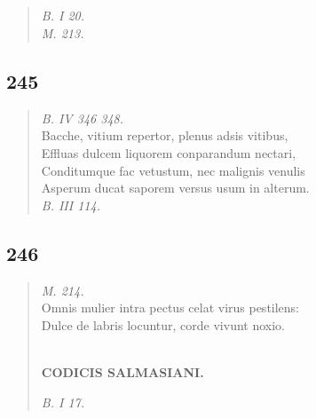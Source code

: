\documentclass[11pt, a4paper]{report}
\begin{document}
            \subsection*{}
      \begin{verse}
      \end{verse}
  
            \subsection*{}
      \begin{verse}
      \textit{B. I 20.} \\ \textit{M. 213.} \\ 
      \end{verse}
  
            \subsection*{245}
      \begin{verse}
      \textit{B. IV 346 348.} \\ Bacche, vitium repertor, plenus adsis vitibus, \\ Effluas dulcem liquorem conparandum nectari, \\ Conditumque fac vetustum, nec malignis venulis \\ Asperum ducat saporem versus usum in alterum. \\ \textit{B. III 114.} \\ 
      \end{verse}
  
            \subsection*{246}
      \begin{verse}
      \textit{M. 214.} \\ Omnis mulier intra pectus celat virus pestilens: \\ Dulce de labris locuntur, corde vivunt noxio. \\ 
        ﻿\pagebreak 
    \begin{center} \textbf{CODICIS SALMASIANI.} \end{center} \marginpar{[201]} \textit{B. I 17.} \\ 
      \end{verse}
  
\end{document}
